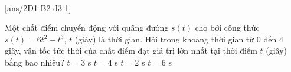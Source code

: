 \\
\setcounter{ex}{0}
[ans/2D1-B2-d3-1]
\begin{ex}%
	Một chất điểm chuyển động với quãng đường $s(t)$ cho bởi công thức $s(t)=6t^2-t^3$, $t$ (giây) là thời gian. Hỏi trong khoảng thời gian từ $0$ đến $4$ giây, vận tốc tức thời của chất điểm đạt giá trị lớn nhất tại thời điểm  $t$ (giây) bằng bao nhiêu?
	\choice
	{$t=3$ s}
	{$t=4$ s}
	{\True $t=2$ s}
	{$t=6$ s}
\end{ex} 


